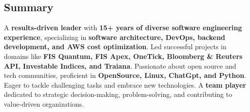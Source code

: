 \subsection*{\color{CarianBlue} \Professional Summary \crulefill{1pt}}

\renewcommand\labelitemi{}
\renewcommand\labelitemii{$\bullet$}
\begin{itemize}[leftmargin=1em]

A \textbf{results-driven leader} with \textbf{15+ years of diverse software engineering experience}, specializing in \textbf{software architecture, DevOps, backend development, and AWS cost optimization}. Led successful projects in domains like \textbf{FIS Quantum, FIS Apex, OneTick, Bloomberg \& Reuters API, Investable Indices, and Traiana}. Passionate about open source and tech communities, proficient in \textbf{OpenSource, Linux, ChatGpt, and Python}. Eager to tackle challenging tasks and embrace new technologies. A \textbf{team player} dedicated to strategic decision-making, problem-solving, and contributing to value-driven organizations.

\end{itemize}